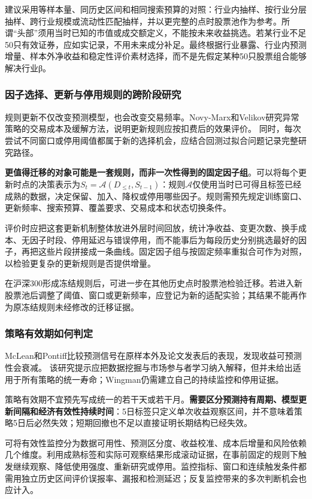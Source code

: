 \documentclass[UTF8,12pt,a4paper,fontset=none]{ctexart}
\begin{document}
建议采用等样本量、同历史区间和相同搜索预算的对照：行业内抽样、按行业分层抽样、跨行业规模或流动性匹配抽样，并以更完整的点时股票池作为参考。所谓“头部”须用当时已知的市值或成交额定义，不能按未来收益挑选。若某行业不足50只有效证券，应如实记录，不用未来成分补足。最终根据行业暴露、行业内预测增量、样本外净收益和稳定性评价素材选择，而不是先假定某种50只股票组合能够解决行业β。


\subsubsection{因子选择、更新与停用规则的跨阶段研究}

规则更新不仅改变预测模型，也会改变交易频率。Novy-Marx和Velikov研究异常策略的交易成本及缓解方法，说明更新规则应按扣费后的效果评价。\cite{r14} 同时，每次尝试不同窗口或停用阈值都属于新的选择机会，应结合回测过拟合问题记录完整研究路径。\cite{r4}


\textbf{更值得迁移的对象可能是一套规则，而非一次性得到的固定因子组}。可以将每个更新时点的决策表示为$S_t=\mathcal A(D_{\leq t},S_{t-1})$：规则$\mathcal A$仅使用当时已可得且标签已经成熟的数据，决定保留、加入、降权或停用哪些因子。规则需预先规定训练窗口、更新频率、搜索预算、覆盖要求、交易成本和状态切换条件。


评价时应把这套更新机制整体放进外层时间回放，统计净收益、变更次数、换手成本、无因子时段、停用延迟与错误停用，而不能事后为每段历史分别挑选最好的因子，再把这些片段拼接成一条曲线。固定因子组与按固定频率重拟合可作为对照，以检验更复杂的更新规则是否提供增量。


在沪深300形成冻结规则后，可进一步在其他历史点时股票池检验迁移。若进入新股票池后调整了阈值、窗口或更新频率，应登记为新的适配实验；其结果不能再作为原冻结规则未经修改的迁移证据。


\subsubsection{策略有效期如何判定}

McLean和Pontiff比较预测信号在原样本外及论文发表后的表现，发现收益可预测性会衰减。\cite{r15} 该研究提示应把数据挖掘与市场参与者学习纳入解释，但并未给出适用于所有策略的统一寿命；Wingman仍需建立自己的持续监控和停用证据。


策略有效期不宜预先写成统一的若干天或若干月。\textbf{需要区分预测持有周期、模型更新间隔和经济有效性持续时间}：5日标签只定义单次收益观察区间，并不意味着策略5日后必然失效；短期回撤也不足以直接证明长期结构已经失效。


可将有效性监控分为数据可用性、预测区分度、收益校准、成本后增量和风险依赖几个维度。利用成熟标签和实际可观察结果形成滚动证据，在事前固定的规则下触发继续观察、降低使用强度、重新研究或停用。监控指标、窗口和连续触发条件都需用独立历史区间评价误报率、漏报和检测延迟；反复监控带来的多次判断机会也应计入。
\end{document}
